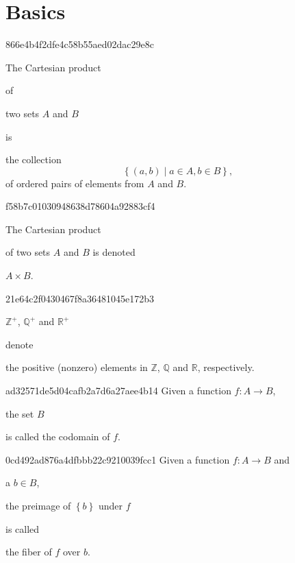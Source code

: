 


\section{Basics}
\begin{note}{866e4b4f2dfe4c58b55aed02dac29e8c}
    \begin{icloze}{2}The Cartesian product\end{icloze} of \begin{icloze}{3}two sets \({ A }\) and \({ B }\)\end{icloze} is
    \begin{icloze}{1}
        the collection
        \[
            \left\{ (a, b) \mid a \in A, b \in B \right\},
        \]
        of ordered pairs of elements from \({ A }\) and \({ B }\).
    \end{icloze}
\end{note}

\begin{note}{f58b7c01030948638d78604a92883cf4}
    \begin{icloze}{2}The Cartesian product\end{icloze} of two sets \({ A }\) and \({ B }\) is denoted \begin{icloze}{1}\({ A \times B }\).\end{icloze}
\end{note}

\begin{note}{21e64c2f0430467f8a36481045e172b3}
    \begin{icloze}{2}\({ \mathbb Z^{+} }\), \({ \mathbb Q^{+} }\) and \({ \mathbb R^{+} }\)\end{icloze} denote \begin{icloze}{1}the positive (nonzero) elements in \({ \mathbb Z }\), \({ \mathbb Q }\) and \({ \mathbb R }\), respectively.\end{icloze}
\end{note}

\begin{note}{ad32571de5d04cafb2a7d6a27aee4b14}
    Given a function \({ f : A \to B }\), \begin{icloze}{1}the set \({ B }\)\end{icloze} is called the codomain of \({ f }\).
\end{note}

\begin{note}{0cd492ad876a4dfbbb22c9210039fcc1}
    Given a function \({ f : A \to B }\) and \begin{icloze}{3}a \({ b \in B }\),\end{icloze} \begin{icloze}{2}the preimage of \({ \left\{ b \right\} }\) under \({ f }\)\end{icloze} is called \begin{icloze}{1}the fiber of \({ f }\) over \({ b }\).\end{icloze}
\end{note}

